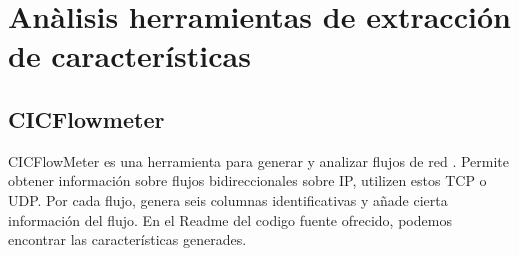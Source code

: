 \section{Anàlisis herramientas de extracción de características}

\subsection{CICFlowmeter}

CICFlowMeter es una herramienta para generar y analizar flujos de red \cite{cicflowpost}. Permite obtener información sobre flujos bidireccionales sobre IP, utilizen estos TCP o UDP. Por cada flujo, genera seis columnas identificativas y añade cierta información del flujo. En el Readme del codigo fuente ofrecido, podemos encontrar las características generades.

